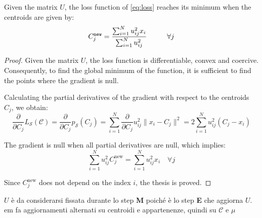 \begin{theorem}
	\label{thm:Mupdate}
    Given the matrix $U$, the loss function of \cref{eq:loss} reaches its minimum when the centroids are given by:
    \begin{equation}
        C^{\texttt{new}}_j = \frac{\sum_{i=1}^Nu_{ij}^2x_{i}}{\sum_{i=1}^Nu_{ij}^2} \text{\hspace{1cm}} \forall j
    \end{equation}
	\begin{proof}
	    Given the matrix $U$, the loss function is differentiable, convex and coercive. Consequently, to find the global minimum of the function, it is sufficient to find the points where the gradient is null.

	    \noindent Calculating the partial derivatives of the gradient with respect to the centroids $C_j$, we obtain:
	\begin{equation*}
	    \frac{\partial}{\partial C_{j}} L_\mathcal{S}(\mathcal{C}) = \frac{\partial}{\partial C_{j}} p_\mathcal{S}(C_j) = \sum_{i=1}^N\frac{\partial}{\partial C_{j}} u_{ij}^2\|x_i-C_j\|^2 = 2\sum_{i=1}^N u_{ij}^2\left(C_{j}-x_{i}\right)
	\end{equation*}

	\noindent The gradient is null when all partial derivatives are null, which implies:
	\begin{equation*}
	    \sum_{i=1}^N u_{ij}^2C^{\text{new}}_{j} = \sum_{i=1}^N u_{ij}^2x_{i} \quad \forall j
	\end{equation*}

	\noindent Since $C^{\text{new}}_j$ does not depend on the index $i$, the thesis is proved.
	\end{proof}

	\begin{note}
		$U$ è da considerarsi fissata durante lo step \textbf{M} poiché è lo step \textbf{E} che aggiorna $U$. \gls{em} fa aggiornamenti alternati su centroidi e appartenenze, quindi su $\mathcal{C}$ e $\mu$
	\end{note}
\end{theorem}

